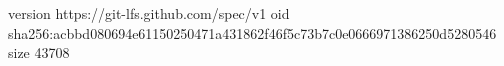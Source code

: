 version https://git-lfs.github.com/spec/v1
oid sha256:acbbd080694e61150250471a431862f46f5c73b7c0e0666971386250d5280546
size 43708
